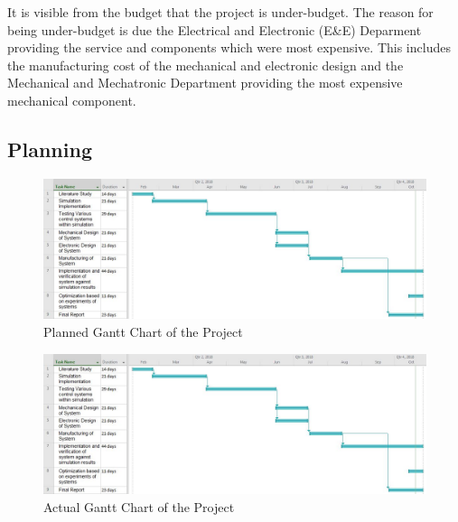 It is visible from the budget that the project is under-budget. The reason for being under-budget is due the Electrical and Electronic (E\&E) Deparment providing the service and components which were most expensive. This includes the manufacturing cost of the mechanical and electronic design and the Mechanical and Mechatronic Department providing the most expensive mechanical component.


\subsection{Planning}

\begin{figure}[h]
	\centering
	\includegraphics[scale=0.5]{./figs/planning_gantt/ganttchart.jpg}
	\caption{Planned Gantt Chart of the Project}
	\label{fig:planned_ganttchart}
\end{figure}

\begin{figure}[h]
	\centering
	\includegraphics[scale=0.5]{./figs/planning_gantt/ganttchart.jpg}
	\caption{Actual Gantt Chart of the Project}
	\label{fig:actual_ganttchart}
\end{figure}


